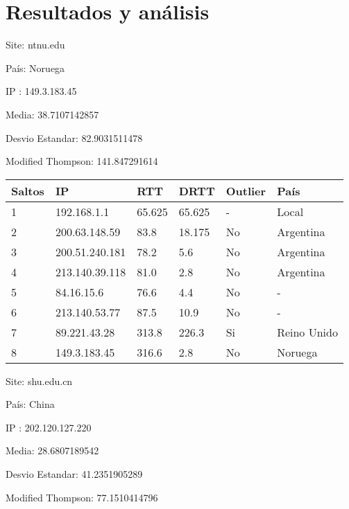 \section{Resultados y análisis}



Site: ntnu.edu

País: Noruega

IP : 149.3.183.45

Media: 38.7107142857 

Desvio Estandar: 82.9031511478 

Modified Thompson: 141.847291614

\begin{center}
    \begin{tabular}{| l | l | l | l | l | l | }
    \hline
    Saltos & IP             & RTT    & DRTT   & Outlier & País        \\ \hline
    1      & 192.168.1.1    & 65.625 & 65.625 & -       & Local       \\ \hline
    2      & 200.63.148.59  & 83.8   & 18.175 & No      & Argentina   \\ \hline
    3      & 200.51.240.181 & 78.2   & 5.6    & No      & Argentina   \\ \hline
    4      & 213.140.39.118 & 81.0   & 2.8    & No      & Argentina   \\ \hline
    5      & 84.16.15.6     & 76.6   & 4.4    & No      & -           \\ \hline
    6      & 213.140.53.77  & 87.5   & 10.9   & No      & -           \\ \hline
    7      & 89.221.43.28   & 313.8  & 226.3  & Si      & Reino Unido \\ \hline
    8      & 149.3.183.45   & 316.6  & 2.8    & No      & Noruega     \\ \hline
    \end{tabular}
\end{center}

Site: shu.edu.cn

País: China

IP : 202.120.127.220

Media: 28.6807189542 

Desvio Estandar: 41.2351905289 

Modified Thompson: 77.1510414796

